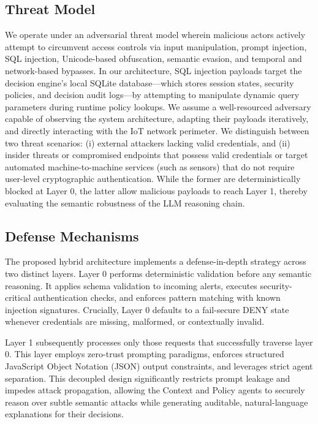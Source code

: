 \documentclass[
]{ceurart}
\begin{document}
\subsection{Threat Model}

We operate under an adversarial threat model wherein malicious actors actively attempt to circumvent access controls via input manipulation, prompt injection, SQL injection, Unicode-based obfuscation, semantic evasion, and temporal and network-based bypasses. In our architecture, SQL injection payloads target the decision engine's local SQLite database—which stores session states, security policies, and decision audit logs—by attempting to manipulate dynamic query parameters during runtime policy lookups. We assume a well-resourced adversary capable of observing the system architecture, adapting their payloads iteratively, and directly interacting with the IoT network perimeter. We distinguish between two threat scenarios: (i) external attackers lacking valid credentials, and (ii) insider threats or compromised endpoints that possess valid credentials or target automated machine-to-machine services (such as sensors) that do not require user-level cryptographic authentication. While the former are deterministically blocked at Layer 0, the latter allow malicious payloads to reach Layer 1, thereby evaluating the semantic robustness of the LLM reasoning chain.

\subsection{Defense Mechanisms}

The proposed hybrid architecture implements a defense-in-depth strategy across two distinct layers. Layer 0 performs deterministic validation before any semantic reasoning. It applies schema validation to incoming alerts, executes security-critical authentication checks, and enforces pattern matching with known injection signatures. Crucially, Layer 0 defaults to a fail-secure DENY state whenever credentials are missing, malformed, or contextually invalid. 

Layer 1 subsequently processes only those requests that successfully traverse layer 0. This layer employs zero-trust prompting paradigms, enforces structured JavaScript Object Notation (JSON) output constraints, and leverages strict agent separation. This decoupled design significantly restricts prompt leakage and impedes attack propagation, allowing the Context and Policy agents to securely reason over subtle semantic attacks while generating auditable, natural-language explanations for their decisions.
\end{document}
